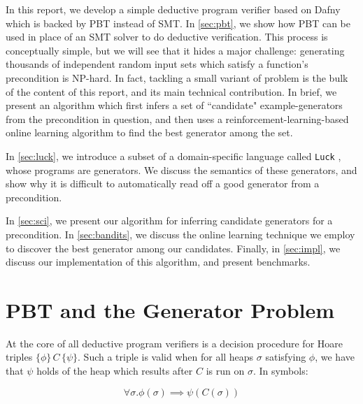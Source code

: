 \documentclass[10pt,a4paper]{article}
\begin{document}
In this report, we develop a simple deductive program verifier based on Dafny which is backed by PBT instead of SMT. In \autoref{sec:pbt}, we show how PBT can be used in place of an SMT solver to do deductive verification. This process is conceptually simple, but we will see that it hides a major challenge: generating thousands of independent random input sets which satisfy a function's precondition is NP-hard. In fact, tackling a small variant of problem is the bulk of the content of this report, and its main technical contribution. In brief, we present an algorithm which first infers a set of ``candidate" example-generators from the precondition in question, and then uses a reinforcement-learning-based online learning algorithm to find the best generator among the set.

In \autoref{sec:luck}, we introduce a subset of a domain-specific language called \texttt{Luck} \cite{}, whose programs are generators. We discuss the semantics of these generators, and show why it is difficult to automatically read off a good generator from a precondition.

In \autoref{sec:sci}, we present our algorithm for inferring candidate generators for a precondition. In \autoref{sec:bandits}, we discuss the online learning technique we employ to discover the best generator among our candidates. Finally, in \autoref{sec:impl}, we discuss our implementation of this algorithm, and present benchmarks.



\section{PBT and the Generator Problem}
\label{sec:pbt}
At the core of all deductive program verifiers is a decision procedure for Hoare triples $\{\phi\}\, C \, \{\psi\}$. Such a triple is valid when for all heaps $\sigma$ satisfying $\phi$, we have that $\psi$ holds of the heap which results after $C$ is run on $\sigma$. In symbols:

\[
\forall \sigma. \phi(\sigma) \implies \psi(C(\sigma)) \tag{$\ast$}
\]
\end{document}
